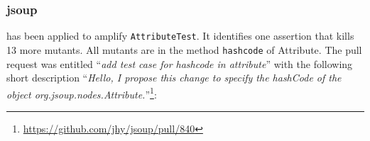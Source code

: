 % 


\subsubsection{jsoup}

\dspot has been applied to amplify \texttt{AttributeTest}. 
It identifies one assertion that kills 13 more mutants.
 All mutants are in the method \texttt{hashcode} of Attribute. 
 The pull request was entitled ``\emph{add test case for hashcode in attribute}'' with the following short description ``\emph{Hello, I propose this change to specify the hashCode of the object org.jsoup.nodes.Attribute.}''\footnote{\url{https://github.com/jhy/jsoup/pull/840}}:
\begin{figure}[H]
	\centering{}
\end{figure}

